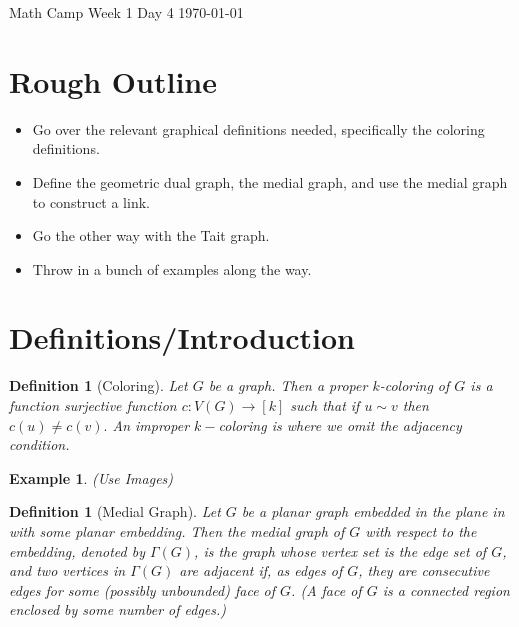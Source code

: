 \documentclass[12pt]{article}
\newtheorem{definition}[theorem]{Definition}
\newtheorem*{example*}{Example}
\begin{document}
	{\large  \hfill Math Camp Week 1 Day 4
\hfill
\today}\\

\section*{Rough Outline}
\begin{itemize}
	\item Go over the relevant graphical definitions needed, specifically the coloring definitions.
	\item Define the geometric dual graph, the medial graph, and use the medial graph to construct a link.
	\item Go the other way with the Tait graph.
	\item Throw in a bunch of examples along the way. %
\end{itemize}
\section*{Definitions/Introduction}
\begin{definition}[Coloring]
	Let $G$ be a graph. Then a proper $k$-coloring of $G$ is a function surjective function $c:V(G)\to [k]$ such that if $u\sim v$ then $c(u)\neq c(v).$ An improper $k-$coloring is where we omit the adjacency condition.
\end{definition}
\begin{example*}
(Use Images)
\end{example*}
\begin{definition}[Medial Graph]
	Let $G$ be a planar graph embedded in the plane in with some planar embedding. Then the \textit{medial graph of $G$ with respect to the embedding}, denoted by $\Gamma(G)$, is the graph whose vertex set is the edge set of $G$, and two vertices in $\Gamma(G)$ are adjacent if, as edges of $G$, they are consecutive edges for some (possibly unbounded) face of $G$. (A \textit{face} of $G$ is a connected region enclosed by some number of edges.)
\end{definition}
\end{document}
